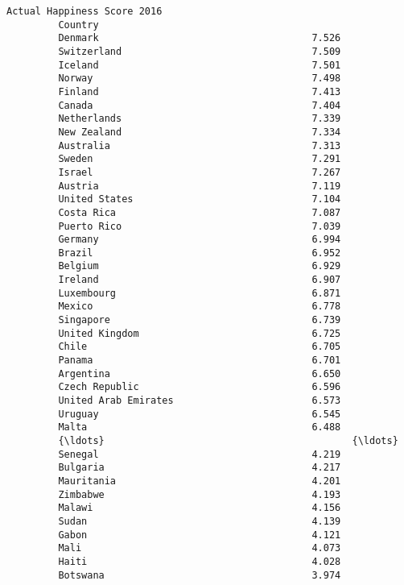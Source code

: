 \documentclass[11pt]{article}
\begin{document}
\begin{Verbatim}[commandchars=\\\{\}]
                               Actual Happiness Score 2016  
         Country                                            
         Denmark                                     7.526  
         Switzerland                                 7.509  
         Iceland                                     7.501  
         Norway                                      7.498  
         Finland                                     7.413  
         Canada                                      7.404  
         Netherlands                                 7.339  
         New Zealand                                 7.334  
         Australia                                   7.313  
         Sweden                                      7.291  
         Israel                                      7.267  
         Austria                                     7.119  
         United States                               7.104  
         Costa Rica                                  7.087  
         Puerto Rico                                 7.039  
         Germany                                     6.994  
         Brazil                                      6.952  
         Belgium                                     6.929  
         Ireland                                     6.907  
         Luxembourg                                  6.871  
         Mexico                                      6.778  
         Singapore                                   6.739  
         United Kingdom                              6.725  
         Chile                                       6.705  
         Panama                                      6.701  
         Argentina                                   6.650  
         Czech Republic                              6.596  
         United Arab Emirates                        6.573  
         Uruguay                                     6.545  
         Malta                                       6.488  
         {\ldots}                                           {\ldots}  
         Senegal                                     4.219  
         Bulgaria                                    4.217  
         Mauritania                                  4.201  
         Zimbabwe                                    4.193  
         Malawi                                      4.156  
         Sudan                                       4.139  
         Gabon                                       4.121  
         Mali                                        4.073  
         Haiti                                       4.028  
         Botswana                                    3.974  

\end{Verbatim}
\end{document}
